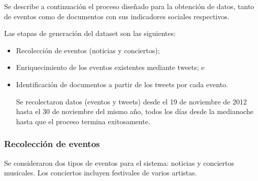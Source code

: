     Se describe a continuación el proceso diseñado para la obtención de
    datos, tanto de eventos como de documentos con sus indicadores
    sociales respectivos.

    Las etapas de generación del dataset son las siguientes:

\begin{itemize}
\item Recolección de eventos (noticias y conciertos);
\item Enriquecimiento de los eventos existentes mediante tweets; e
\item Identificación de documentos a partir de los tweets por cada evento.

      Se recolectaron datos (eventos y tweets) desde el 19 de noviembre de
      2012 hasta el 30 de noviembre del mismo año, todos los días
      desde la medianoche hasta que el proceso termina exitosamente.
\end{itemize}
\subsubsection{Recolección de eventos}

Se consideraron dos tipos de eventos para el sistema: noticias y
conciertos musicales. Los conciertos incluyen festivales de varios
artistas.

